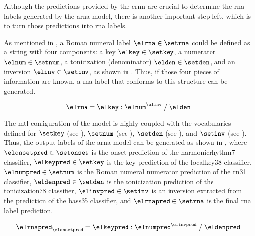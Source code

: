 
Although the predictions provided by the \gls{crnn} are
crucial to determine the \gls{rna} labels generated by the
\gls{arna} model, there is another important step left,
which is to turn those predictions into \gls{rna} labels.

As mentioned in
, a Roman
numeral label $\elrna \in \setrna$ could be defined as a
string with four components: a key $\elkey \in \setkey$, a
numerator $\elnum \in \setnum$, a tonicization (denominator)
$\elden \in \setden$, and an inversion $\elinv \in \setinv$,
as shown in . Thus, if those four pieces of
information are known, a \gls{rna} label that conforms to
this structure can be generated.

\begin{equation}
    \label{eq:rna}
    \elrna = \elkey : \elnum^{\elinv} \; / \; \elden
\end{equation}


The \gls{mtl} configuration of the model is highly coupled
with the vocabularies defined for $\setkey$ (see
), $\setnum$ (see
), $\setden$
(see ), and
$\setinv$ (see
). Thus,
the output labels of the \gls{arna} model can be generated
as shown in , where $\elonsetpred \in
\setonset$ is the onset prediction of the
\gls{harmonicrhythm7} classifier, $\elkeypred \in \setkey$
is the key prediction of the \gls{localkey38} classifier,
$\elnumpred \in \setnum$ is the Roman numeral numerator
prediction of the \gls{rn31} classifier, $\eldenpred \in
\setden$ is the tonicization prediction of the
\gls{tonicization38} classifier, $\elinvpred \in \setinv$ is
an inversion extracted from the prediction of the
\gls{bass35} classifier, and $\elrnapred \in \setrna$ is the
final \gls{rna} label prediction.

\begin{equation}
    \label{eq:rna_pred}
    \elrnapred_{\elonsetpred} = \elkeypred : \elnumpred^{\elinvpred} \; / \; \eldenpred
\end{equation}

